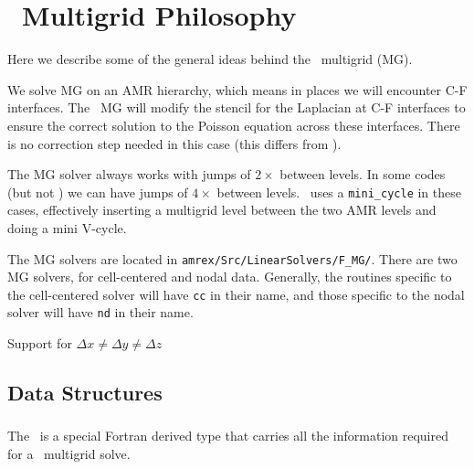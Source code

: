 \label{ch:mg}


\section{\amrex\ Multigrid Philosophy}

Here we describe some of the general ideas behind the \amrex\
multigrid (MG).

We solve MG on an AMR hierarchy, which means in places we will encounter
C-F interfaces.  The \amrex\ MG will modify the stencil for the Laplacian
at C-F interfaces to ensure the correct solution to the Poisson equation
across these interfaces.  There is no correction step needed in this
case (this differs from \cite{ricker:2008}).

The MG solver always works with jumps of $2\times$ between levels.  In 
some codes (but not \maestro) we can have jumps of $4\times$ between
levels.  \amrex\ uses a {\tt mini\_cycle} in these cases, effectively
inserting a multigrid level between the two AMR levels and doing a mini
V-cycle.

The MG solvers are located in {\tt amrex/Src/LinearSolvers/F\_MG/}.
There are two MG solvers, for cell-centered and nodal data.
Generally, the routines specific to the cell-centered solver will have
{\tt cc} in their name, and those specific to the nodal solver will have
{\tt nd} in their name.

Support for $\Delta x \ne \Delta y \ne \Delta z$




\subsection{Data Structures}

\subsubsection{\mgtower}

The \mgtower\ is a special Fortran derived type that carries all the
information required for a \amrex\ multigrid solve.

